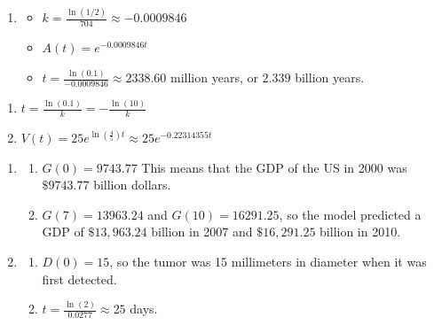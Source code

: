 \begin{enumerate}
\setcounter{enumi}{\value{HW}}

\item  \begin{itemize}  \item $k = \frac{\ln(1/2)}{704} \approx -0.0009846$

\item $A(t) = e^{-0.0009846t}$

\item $t = \frac{\ln(0.1)}{-0.0009846} \approx 2338.60$ million years, or $2.339$ billion years.

\end{itemize}


\setcounter{HW}{\value{enumi}}
\end{enumerate}

\begin{multicols}{2}
\begin{enumerate}
\setcounter{enumi}{\value{HW}}


\item  $t = \frac{\ln(0.1)}{k} = -\frac{\ln(10)}{k}$

\item $V(t) = 25e^{\ln\left(\frac{4}{5}\right)t} \approx 25e^{-0.22314355t}$

\setcounter{HW}{\value{enumi}}
\end{enumerate}
\end{multicols}


\begin{enumerate}
\setcounter{enumi}{\value{HW}}


\item \begin{enumerate}  \item  $G(0) = 9743.77$  This means that the GDP of the US in 2000 was $\$9743.77$ billion dollars.

\item  $G(7) = 13963.24$ and $G(10) = 16291.25$, so the model predicted a GDP of $\$ 13,963.24$ billion in 2007 and $\$ 16,291.25$ billion in 2010. 

\end{enumerate}

\item \begin{enumerate} \item $D(0) = 15$, so the tumor was 15 millimeters in diameter when it was first detected.

\item  $t = \frac{\ln(2)}{0.0277} \approx 25$ days.

\end{enumerate}

\setcounter{HW}{\value{enumi}}
\end{enumerate}

